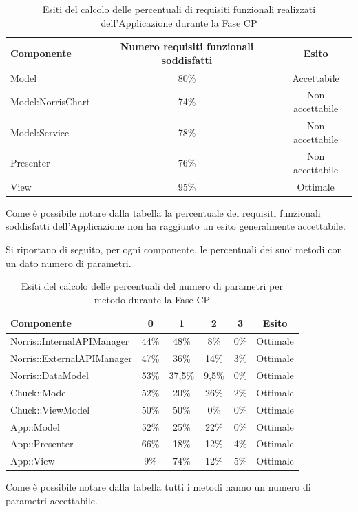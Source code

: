 \begin{table}[H]
	\centering
		\begin{tabu}{| l | c | c |}
			\hline
			Componente	& Numero requisiti funzionali soddisfatti	& Esito		\\ \hline \hline
			Model				&   80\% 	& Accettabile  \\ \hline
			Model:NorrisChart	&   74\% 	& Non accettabile  \\ \hline
			Model:Service 		& 	78\%	& Non accettabile   \\ \hline
			Presenter  			& 	76\%	& Non accettabile  \\ \hline
			View  				& 	95\%	& Ottimale  \\ \hline
		\end{tabu}
	\caption{Esiti del calcolo delle percentuali di requisiti funzionali realizzati dell'Applicazione durante la Fase CP}
\end{table}
Come è possibile notare dalla tabella la percentuale dei requisiti funzionali soddisfatti dell'Applicazione non ha raggiunto un esito generalmente accettabile.


Si riportano di seguito, per ogni componente, le percentuali dei suoi metodi con un dato numero di parametri.
\begin{table}[H]
	\centering
		\begin{tabu}{| l | c | c | c | c | c | }
			\hline
			Componente	& 0 & 1 & 2 & 3 & Esito		\\ \hline \hline
			Norris::InternalAPIManager	& 44\% & 48\% & 8\% & 0\% & Ottimale  \\ \hline
			Norris::ExternalAPIManager  & 	47\% & 36\% & 14\% & 3\%	& Ottimale  \\ \hline
			Norris::DataModel  & 	53\%	&  37,5\% & 9,5\% & 0\% & Ottimale  \\ \hline
			Chuck::Model & 52\% & 20\% & 26\% & 2\% & Ottimale \\ \hline
			Chuck::ViewModel & 50\% & 50\% & 0\% & 0\% & Ottimale \\ \hline
			App::Model & 52\% & 25\% & 22\% & 0\% & Ottimale \\ \hline
			App::Presenter & 66\% & 18\% & 12\% & 4\% & Ottimale \\ \hline
			App::View & 9\% & 74\% & 12\% & 5\% & Ottimale \\ \hline
		\end{tabu}
	\caption{Esiti del calcolo delle percentuali del numero di parametri per metodo durante la Fase CP}
\end{table}
Come è possibile notare dalla tabella tutti i metodi hanno un numero di parametri accettabile. 
\\ \\

